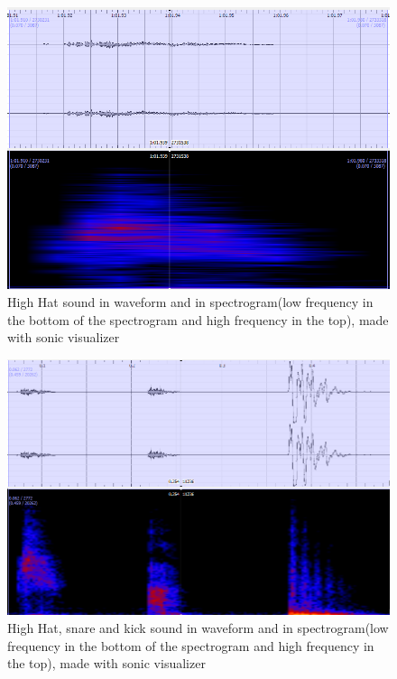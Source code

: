\begin{figure}[h]
	\begin{center}
		\includegraphics[scale =  0.4]{fig/HH-close-up-with-spectrogram.png}
		\caption{High Hat sound in waveform and in spectrogram(low frequency in the bottom of the spectrogram and high frequency in the top), made with sonic visualizer}
		\label{HHCloseup}
	\end{center}
\end{figure}

\begin{figure}[h]
	\begin{center}
		\includegraphics[scale =  0.6]{fig/hh-snare-kick-with-spectogram.png}
		\caption{High Hat, snare and kick sound in waveform and in spectrogram(low frequency in the bottom of the spectrogram and high frequency in the top), made with sonic visualizer}
		\label{HH-Snare-Kick}
	\end{center}
\end{figure}
